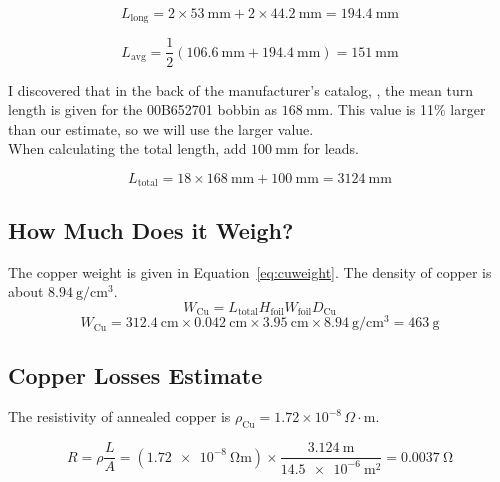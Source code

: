 \documentclass{article}
\begin{document}
\begin{equation}
    L_{\text{long}} = 2 \times \SI{53}{\milli\meter} + 2 \times \SI{44.2}{\milli\meter} = \SI{194.4}{\milli\meter}
\end{equation}

\begin{equation}
    L_{\text{avg}} = \frac{1}{2} \left( \SI{106.6}{\milli\meter} + \SI{194.4}{\milli\meter} \right) = \SI{151}{\milli\meter}
\end{equation}

I discovered that in the back of the manufacturer's catalog, \cite[p. 197]{magincPowderCat2024}, the mean turn length is given for the 00B652701 bobbin as $\SI{168}{\milli\meter}$.  This value is 11\% larger than our estimate, so we will use the larger value. \\

When calculating the total length, add $\SI{100}{\milli\meter}$ for leads.

\begin{equation}
    L_{\text{total}} = \num{18} \times \SI{168}{\milli\meter} + \SI{100}{\milli\meter} = \SI{3124}{\milli\meter}
\end{equation}

\subsection{How Much Does it Weigh?}
The copper weight is given in Equation~\eqref{eq:cuweight}.  The density of copper is about $\SI{8.94}{\gram\per\centi\meter\cubed}$.
\begin{equation}
W_\text{Cu} = L_\text{total} H_\text{foil} W_\text{foil} D_\text{Cu}
\label{eq:cuweight}
\end{equation}
\begin{equation}
W_\text{Cu} = \SI{312.4}{\centi\meter} \times \SI{0.042}{\centi\meter} \times \SI{3.95}{\centi\meter} \times \SI{8.94}{\gram\per\centi\meter\cubed} = \SI{463}{\gram}
\end{equation}

\subsection{Copper Losses Estimate}
The resistivity of annealed copper is $\rho_{\text{Cu}} = 1.72 \times 10^{-8} \, \Omega\cdot\text{m}$.

\begin{equation}
    R = \rho \frac{L}{A} = \left(\SI{1.72e-8}{\ohm\meter} \right) \times \frac{\SI{3.124}{\meter}}{\SI{14.5e-6}{\meter\squared}} = \SI{0.0037}{\ohm}
\end{equation}
\end{document}
